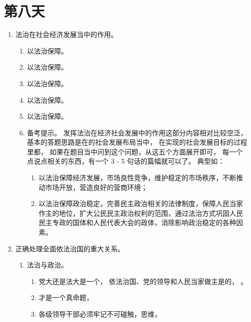 \section{第八天}
\begin{enumerate}
  \item 法治在社会经济发展当中的作用。
        \begin{enumerate}
          \item 以法治保障。
          \item 以法治保障。
          \item 以法治保障。
          \item 以法治保障。
          \item 以法治保障。
          \item 备考提示。
                发挥法治在经济社会发展中的作用这部分内容相对比较空泛，基本的答题思路是在的社会发展布局当中，
                在实现的社会发展目标的过程里都，
                如果在题目当中问到这个问题，从这五个方面展开即可，
                每一个点说点相关的东西，有一个 3 - 5 句话的篇幅就可以了。
                典型如：
                \begin{enumerate}
                  \item 以法治保障经济发展，市场良性竞争，维护稳定的市场秩序，不断推动市场开放，营造良好的营商环境；
                  \item 以法治保障政治稳定，完善民主政治相关的法律制度，保障人民当家作主的地位，扩大公民民主政治权利的范围，通过法治方式巩固人民民主专政的国体和人民代表大会的政体，消除影响政治稳定的各种因素。
                \end{enumerate}
        \end{enumerate}
  \item 正确处理全面依法治国的重大关系。
        \begin{enumerate}
          \item 法治与政治。
                \begin{enumerate}
                  \item 党大还是法大是一个，
                        依法治国、党的领导和人民当家做主是的，
                        。
                  \item {}才是一个真命题，
                  \item 各级领导干部必须牢记不可碰触，思维，

\end{enumerate}
\end{enumerate}
\end{enumerate}
